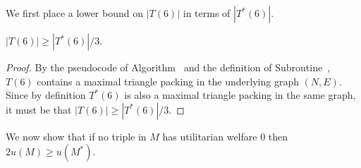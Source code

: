 We first place a lower bound on $|T(6)|$ in terms of $|T^*(6)|$.
\begin{lem}
\label{lem:threed_sr_as_tau_a_geq_tau_opt_over_3}
$|T(6)| \geq |T^*(6)|/3$.
\end{lem}
\begin{proof}
By the pseudocode of Algorithm~ and the definition of Subroutine~, $T(6)$ contains a maximal triangle packing in the underlying graph $(N, E)$. Since by definition $T^*(6)$ is also a maximal triangle packing in the same graph, it must be that $|T(6)| \geq |T^*(6)|/3$.
\end{proof}

We now show that if no triple in $M$ has utilitarian welfare $0$ then $2u(M) \geq u(M^*)$.

